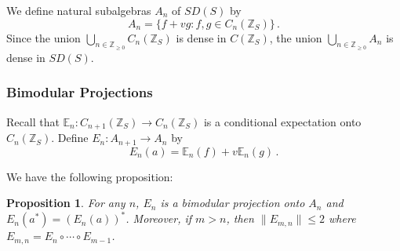 \documentclass[12pt,reqno]{amsart}
\numberwithin{equation}{section}
\newcommand{\E}{{\mathbb E}}
\newcommand{\Z}{{\mathbb Z}}
\newtheorem{prop}[theo]{{\sc \bf Proposition}}
\begin{document}
We define natural subalgebras $A_n$ of $SD(S)$ by 
\begin{equation*}
    A_n=\{f+vg: f,g\in C_n(\Z_S)\}\,.
\end{equation*}
Since the union $\bigcup_{n\in\Z_{\geq0}}C_n(\Z_S)$ is dense in $C(\Z_S)$, the union
$\bigcup_{n\in\Z_{\geq0}}A_n$ is dense in $SD(S)$.

\subsubsection{Bimodular Projections}

Recall that $\E_n:C_{n+1}(\Z_S)\to C_n(\Z_S)$ is a conditional expectation onto $C_n(\Z_S)$.  Define $E_n:A_{n+1}\to A_n$ by
\begin{equation*}
E_n(a) = \E_n(f)+v\E_n(g)\,.
\end{equation*}

We have the following proposition:
\begin{prop}
For any $n$, $E_n$ is a bimodular projection onto $A_n$ and $E_n(a^*)=\left(E_n(a)\right)^*$.  Moreover, if $m>n$, then $\|E_{m,n}\|\le 2$ where $E_{m,n}=E_n\circ\cdots\circ E_{m-1}$.
\end{prop}
\end{document}
